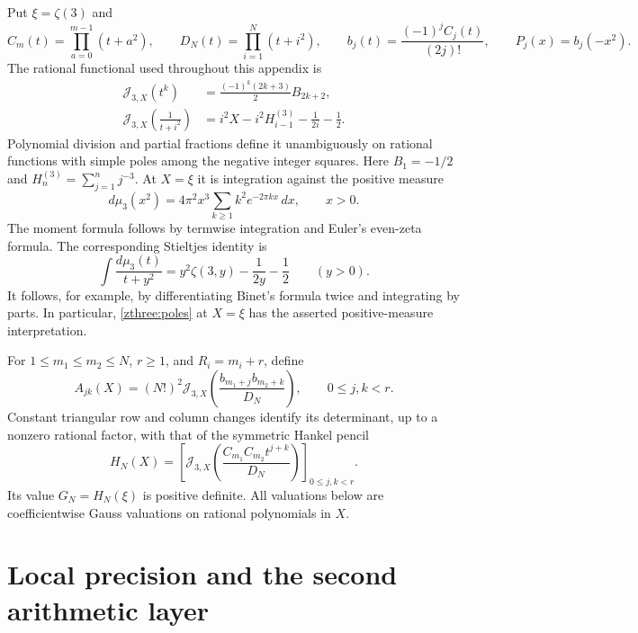 \documentclass[11pt]{article}
\theoremstyle{definition}\newtheorem{definition}[theorem]{Definition}
\theoremstyle{remark}\newtheorem{remark}[theorem]{Remark}
\begin{document}
Put $\xi=\zeta(3)$ and
\[
 C_m(t)=\prod_{a=0}^{m-1}(t+a^2),\qquad
 D_N(t)=\prod_{i=1}^N(t+i^2),\qquad
 b_j(t)=\frac{(-1)^jC_j(t)}{(2j)!},\qquad
 P_j(x)=b_j(-x^2).
\]
The rational functional used throughout this appendix is
\begin{align}
 \mathcal J_{3,X}(t^k)&=\frac{(-1)^k(2k+3)}2B_{2k+2},\label{zthree:moments}\\
 \mathcal J_{3,X}\left(\frac1{t+i^2}\right)
 &=i^2X-i^2H_{i-1}^{(3)}-\frac1{2i}-\frac12.\label{zthree:poles}
\end{align}
Polynomial division and partial fractions define it unambiguously on
rational functions with simple poles among the negative integer squares.
Here $B_1=-1/2$ and $H_n^{(3)}=\sum_{j=1}^n j^{-3}$.
At $X=\xi$ it is integration against the positive measure
\begin{equation}\label{zthree:measure}
 d\mu_3(x^2)=4\pi^2x^3\sum_{k\ge1}k^2e^{-2\pi kx}\,dx,
 \qquad x>0.
\end{equation}
The moment formula follows by termwise integration and Euler's even-zeta
formula. The corresponding Stieltjes identity is
\[
 \int\frac{d\mu_3(t)}{t+y^2}
   =y^2\zeta(3,y)-\frac1{2y}-\frac12\qquad(y>0).
\]
It follows, for example, by differentiating Binet's formula twice and
integrating by parts. In particular, \eqref{zthree:poles} at $X=\xi$
has the asserted positive-measure interpretation.

For $1\le m_1\le m_2\le N$, $r\ge1$, and $R_i=m_i+r$, define
\begin{equation}\label{zthree:matrix}
 A_{jk}(X)=(N!)^2\mathcal J_{3,X}
 \left(\frac{b_{m_1+j}b_{m_2+k}}{D_N}\right),\qquad 0\le j,k<r.
\end{equation}
Constant triangular row and column changes identify its determinant,
up to a nonzero rational factor, with that of the symmetric Hankel pencil
\begin{equation}\label{zthree:hankel}
 H_N(X)=\left[\mathcal J_{3,X}
 \left(\frac{C_{m_1}C_{m_2}t^{j+k}}{D_N}\right)\right]_{0\le j,k<r}.
\end{equation}
Its value $G_N=H_N(\xi)$ is positive definite. All valuations below are
coefficientwise Gauss valuations on rational polynomials in $X$.

\section{Local precision and the second arithmetic layer}
\label{zthree:local}
\end{document}
